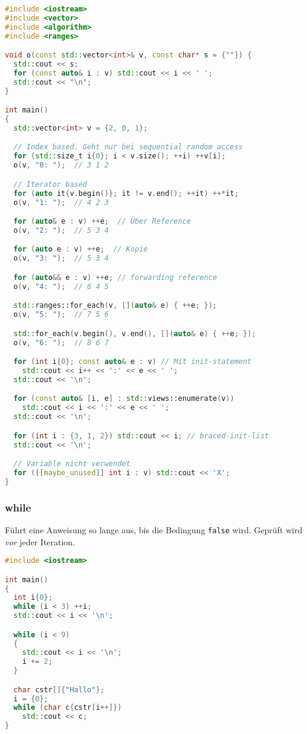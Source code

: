 \documentclass[10pt,twocolumn]{scrartcl}
\begin{document}
\begin{lstlisting}[language=C++]
#include <iostream>
#include <vector>
#include <algorithm>
#include <ranges>

void o(const std::vector<int>& v, const char* s = {""}) {
  std::cout << s;
  for (const auto& i : v) std::cout << i << ' ';
  std::cout << "\n";
}

int main()
{
  std::vector<int> v = {2, 0, 1};

  // Index based. Geht nur bei sequential random access
  for (std::size_t i{0}; i < v.size(); ++i) ++v[i];
  o(v, "0: ");  // 3 1 2

  // Iterator based
  for (auto it{v.begin()}; it != v.end(); ++it) ++*it;
  o(v, "1: ");  // 4 2 3

  for (auto& e : v) ++e;  // Über Reference
  o(v, "2: ");  // 5 3 4

  for (auto e : v) ++e;  // Kopie
  o(v, "3: ");  // 5 3 4

  for (auto&& e : v) ++e; // forwarding reference
  o(v, "4: ");  // 6 4 5

  std::ranges::for_each(v, [](auto& e) { ++e; });
  o(v, "5: ");  // 7 5 6

  std::for_each(v.begin(), v.end(), [](auto& e) { ++e; });
  o(v, "6: ");  // 8 6 7

  for (int i{0}; const auto& e : v) // Mit init-statement
    std::cout << i++ << ':' << e << ' ';
  std::cout << '\n';

  for (const auto& [i, e] : std::views::enumerate(v))
    std::cout << i << ':' << e << ' ';
  std::cout << '\n';

  for (int i : {3, 1, 2}) std::cout << i; // braced-init-list
  std::cout << '\n';

  // Variable nicht verwendet
  for ([[maybe_unused]] int i : v) std::cout << 'X';
}
\end{lstlisting}

\subsubsection{while}

Führt eine Anweisung so lange aus, bis die Bedingung \lstinline|false| wird.
Geprüft wird \emph{vor} jeder Iteration.

\begin{lstlisting}[language=C++]
#include <iostream>

int main()
{
  int i{0};
  while (i < 3) ++i;
  std::cout << i << '\n';

  while (i < 9)
  {
    std::cout << i << '\n';
    i += 2;
  }

  char cstr[]{"Hallo"};
  i = {0};
  while (char c{cstr[i++]})
    std::cout << c;
}
\end{lstlisting}
\end{document}
